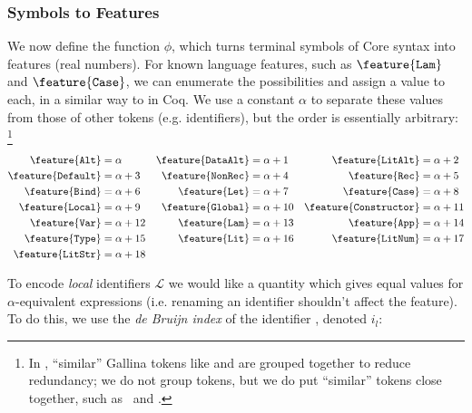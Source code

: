 \subsubsection{Symbols to Features}
\label{sec:symbolstofeatures}

We now define the function $\phi$, which turns terminal symbols of Core syntax
into features (real numbers). For known language features, such as
$\feature{\CLam}$ and $\feature{\CCase}$, we can enumerate the possibilities and
assign a value to each, in a similar way to \cite{DBLP:journals/corr/HerasK14}
in Coq. We use a constant $\alpha$ to separate these values from those of other
tokens (e.g. identifiers), but the order is essentially arbitrary: \footnote{In
  \cite{DBLP:journals/corr/HerasK14}, ``similar'' Gallina tokens like 
  and  are grouped together to reduce redundancy; we do not group
  tokens, but we do put ``similar'' tokens close together, such as \CLocal\ and
  \CGlobal.}

\begin{equation} \label{eq:feature}
  \begin{aligned}
    \feature{\CAlt}          &= \alpha      &
    \feature{\CDataAlt}      &= \alpha + 1  &
    \feature{\CLitAlt}       &= \alpha + 2  \\
    \feature{\CDefault}      &= \alpha + 3  &
    \feature{\CNonRec}       &= \alpha + 4  &
    \feature{\CRec}          &= \alpha + 5  \\
    \feature{\CBind}         &= \alpha + 6  &
    \feature{\CLet}          &= \alpha + 7  &
    \feature{\CCase}         &= \alpha + 8  \\
    \feature{\CLocal}        &= \alpha + 9  &
    \feature{\CGlobal}       &= \alpha + 10 &
    \feature{\CConstructor}  &= \alpha + 11 \\
    \feature{\CVar}          &= \alpha + 12 &
    \feature{\CLam}          &= \alpha + 13 &
    \feature{\CApp}          &= \alpha + 14 \\
    \feature{\CType}         &= \alpha + 15 &
    \feature{\CLit}          &= \alpha + 16 &
    \feature{\CLitNum}       &= \alpha + 17 \\
    \feature{\CLitStr}       &= \alpha + 18
  \end{aligned}
\end{equation}

To encode \emph{local} identifiers $\mathcal{L}$ we would like a quantity which
gives equal values for $\alpha$-equivalent expressions (i.e. renaming an
identifier shouldn't affect the feature). To do this, we use the \emph{de Bruijn
  index} of the identifier \cite{de1972lambda}, denoted $i_l$:

